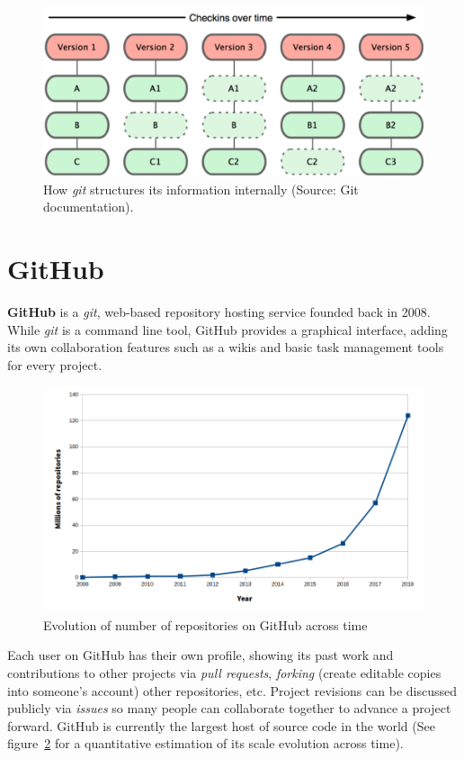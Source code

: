 \documentclass[a4paper, 12pt]{book}
\begin{document}
\begin{figure}
  \centering
  \includegraphics[width=12cm, keepaspectratio]{img/snapshots-git}
  \caption{How \emph{git} structures its information internally (Source: Git documentation).}
  \label{fig:info-git}
\end{figure}
\section{GitHub}
\label{sec:github}
\textbf{GitHub} is a \emph{git}, web-based repository hosting service founded back in 2008. While \emph{git} is a command
line tool, GitHub provides a graphical interface, adding its own collaboration features such as a wikis and basic task
management tools for every project.\\
\begin{figure}
  \centering
  \includegraphics[width=14cm, keepaspectratio]{img/number-github-repos}
  \caption{Evolution of number of repositories on GitHub across time}
  \label{fig:total-repo-number}
\end{figure}
Each user on GitHub has their own profile, showing its past work and contributions to
other projects via \textit{pull requests}, \textit{forking} (create editable copies into someone's account) other repositories, etc.
Project revisions can be discussed publicly via \textit{issues} so many people can collaborate together to advance a project
forward. GitHub is currently the largest host of source code in the world (See figure~\ref{fig:total-repo-number} for a quantitative
estimation of its scale evolution across time).
\end{document}
